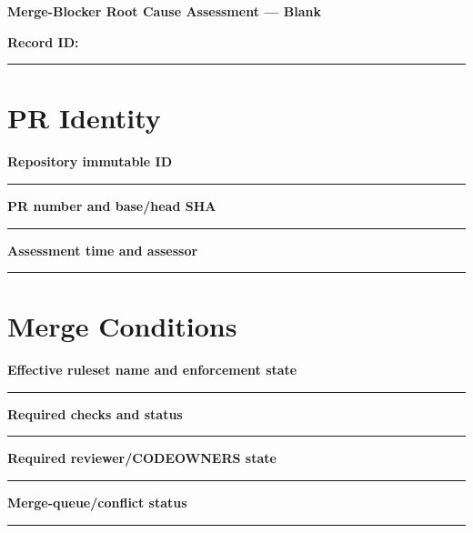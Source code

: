 \documentclass[11pt,letterpaper]{article}
\begin{document}
\begin{center}{\LARGE\bfseries Merge-Blocker Root Cause Assessment --- Blank}\par
\vspace{4pt}{\small Print-ready unfilled assessment instrument}\par
\end{center}
\noindent\textbf{Record ID:} \rule{2.6in}{0.4pt}\par
\section{PR Identity}
\noindent\textbf{Repository immutable ID}\par
\vspace{1.1em}\noindent\rule{0.96\linewidth}{0.4pt}\par\vspace{0.65em}
\noindent\textbf{PR number and base/head SHA}\par
\vspace{1.1em}\noindent\rule{0.96\linewidth}{0.4pt}\par\vspace{0.65em}
\noindent\textbf{Assessment time and assessor}\par
\vspace{1.1em}\noindent\rule{0.96\linewidth}{0.4pt}\par\vspace{0.65em}
\section{Merge Conditions}
\noindent\textbf{Effective ruleset name and enforcement state}\par
\vspace{1.1em}\noindent\rule{0.96\linewidth}{0.4pt}\par\vspace{0.65em}
\noindent\textbf{Required checks and status}\par
\vspace{1.1em}\noindent\rule{0.96\linewidth}{0.4pt}\par\vspace{0.65em}
\noindent\textbf{Required reviewer/CODEOWNERS state}\par
\vspace{1.1em}\noindent\rule{0.96\linewidth}{0.4pt}\par\vspace{0.65em}
\noindent\textbf{Merge-queue/conflict status}\par
\vspace{1.1em}\noindent\rule{0.96\linewidth}{0.4pt}\par\vspace{0.65em}
\end{document}
